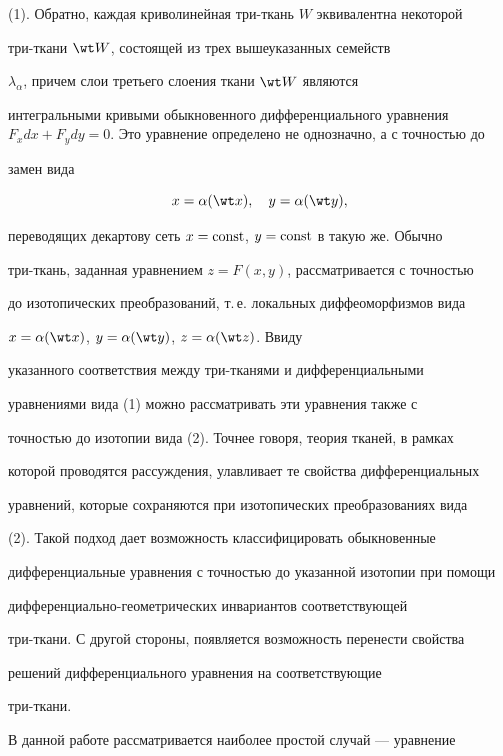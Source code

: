 (1). Обратно, каждая криволинейная три-ткань $W$ эквивалентна некоторой 


три-ткани $\wt W$, состоящей из трех вышеуказанных семейств 


$\lambda_\alpha$, причем слои третьего слоения ткани $\wt W$ являются 


интегральными кривыми обыкновенного дифференциального уравнения $F_x 


dx+F_y dy=0$. Это уравнение определено не однозначно, а с точностью до 


замен вида 


\begin{equation} 


x=\alpha(\wt x),\quad y=\alpha(\wt y), 


\end{equation} 


переводящих декартову сеть $x=\operatorname{const}$, $y=\operatorname{const}$ в такую же. Обычно 


три-ткань, заданная уравнением $z=F(x,y)$, рассматривается с точностью 


до изотопических преобразований, т.\,е. локальных диффеоморфизмов вида 


$x=\alpha(\wt x)$, $y=\alpha(\wt y)$, $z=\alpha(\wt z)$. Ввиду 


указанного соответствия между три-тканями и дифференциальными 


уравнениями вида (1) можно рассматривать эти уравнения также с 


точностью до изотопии вида (2). Точнее говоря, теория тканей, в рамках 


которой проводятся рассуждения, улавливает те свойства дифференциальных 


уравнений, которые сохраняются при изотопических преобразованиях вида 


(2). Такой подход дает возможность классифицировать обыкновенные 


дифференциальные уравнения с точностью до указанной изотопии при помощи 


дифференциально-гео\-мет\-ри\-чес\-ких инвариантов соответствующей 


три-ткани. С другой стороны, появляется возможность перенести свойства 


решений дифференциального уравнения на соответствующие


три-ткани. 


 


В данной работе рассматривается наиболее простой случай --- уравнение 


